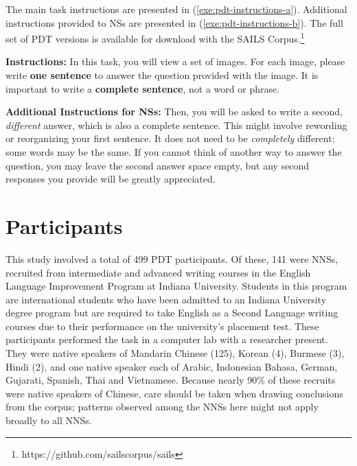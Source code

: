The main task instructions are presented in (\ref{exe:pdt-instructions-a}). Additional instructions provided to NSs are presented in (\ref{exe:pdt-instructions-b}). The full set of PDT versions is available for download with the SAILS Corpus.\footnote{https://github.com/sailscorpus/sails}

\begin{exe}
  \ex\label{exe:pdt-instructions-a}\textbf{Instructions:} In this task, you will view a set of images. For each image, please write \textbf{one sentence} to answer the question provided with the image. It is important to write a \textbf{complete sentence}, not a word or phrase.
\end{exe}

\begin{exe}
  \ex\label{exe:pdt-instructions-b}\textbf{Additional Instructions for NSs:} Then, you will be asked to write a second, \textit{different} answer, which is also a complete sentence. This might involve rewording or reorganizing your first sentence. It does not need to be \textit{completely} different; some words may be the same. If you cannot think of another way to answer the question, you may leave the second answer space empty, but any second responses you provide will be greatly appreciated.
\end{exe}

\section{Participants}
\label{sec:participants}

This study involved a total of 499 PDT participants. Of these, 141 were NNSs, recruited from intermediate and advanced writing courses in the English Language Improvement Program at Indiana University. Students in this program are international students who have been admitted to an Indiana University degree program but are required to take English as a Second Language writing courses due to their performance on the university's placement test.
These participants performed the task in a computer lab with a researcher present. They were native speakers of Mandarin Chinese (125), Korean (4), Burmese (3), Hindi (2), and one native speaker each of Arabic, Indonesian Bahasa, German, Gujarati, Spanish, Thai and Vietnamese. Because nearly 90\% of these recruits were native speakers of Chinese, care should be taken when drawing conclusions from the corpus; patterns observed among the NNSs here might not apply broadly to all NNSs.

